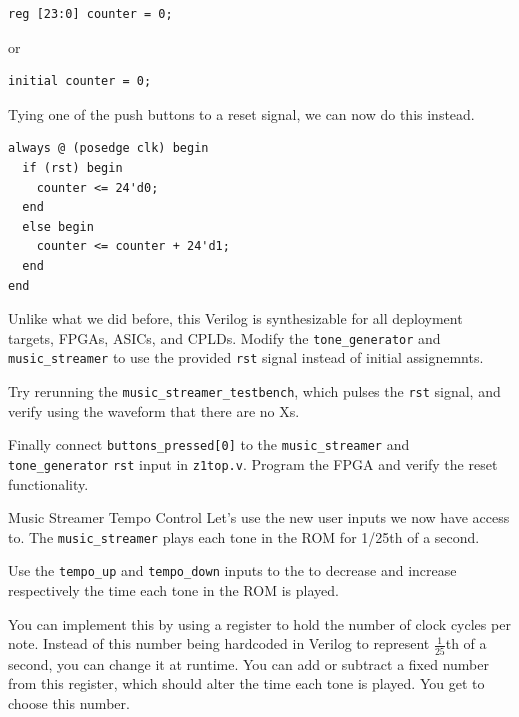\documentclass[11pt]{article}
\makeatletter
\renewcommand{\section}
{\@startsection {section}{1}{0pt}
 {-2ex}
 {1ex}
 {\bfseries\Large}}
\newcommand*\ttvar[1]{\texttt{\expandafter\dottvar\detokenize{#1}\relax}}
\newcommand*\dottvar[1]{\ifx\relax#1\else
  \expandafter\ifx\string_#1\string_\allowbreak\else#1\fi
  \expandafter\dottvar\fi}
\makeatother
\begin{document}
\begin{verbatim}
reg [23:0] counter = 0;
\end{verbatim}
or
\begin{verbatim}
initial counter = 0;
\end{verbatim}

Tying one of the push buttons to a reset signal, we can now do this instead.

\begin{verbatim}
always @ (posedge clk) begin
  if (rst) begin
    counter <= 24'd0;
  end
  else begin
    counter <= counter + 24'd1;
  end
end
\end{verbatim}

Unlike what we did before, this Verilog is synthesizable for all deployment targets, FPGAs, ASICs, and CPLDs.
Modify the \verb|tone_generator| and \verb|music_streamer| to use the provided \verb|rst| signal instead of initial assignemnts.

Try rerunning the \verb|music_streamer_testbench|, which pulses the \verb|rst| signal, and verify using the waveform that there are no Xs.

Finally connect \verb|buttons_pressed[0]| to the \verb|music_streamer| and \verb|tone_generator| \verb|rst| input in \verb|z1top.v|.
Program the FPGA and verify the reset functionality.

\section{Music Streamer Tempo Control}
Let's use the new user inputs we now have access to.
The \verb|music_streamer| plays each tone in the ROM for 1/25th of a second.

Use the \verb|tempo_up| and \verb|tempo_down| inputs to the \ttvar{music_streamer} to decrease and increase respectively the time each tone in the ROM is played.


You can implement this by using a register to hold the number of clock cycles per note.
Instead of this number being hardcoded in Verilog to represent $\frac{1}{25}$th of a second, you can change it at runtime.
You can add or subtract a fixed number from this register, which should alter the time each tone is played.
You get to choose this number.
\end{document}
